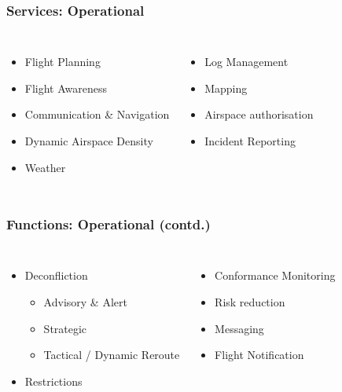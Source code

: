 \documentclass[usenames,dvipsnames,aspectratio=169,serif]{beamer}
\begin{document}

\begin{frame}
   \frametitle{Services: Operational}
   \begin{columns}[t] %

      \begin{itemize}
         \item Flight Planning
         \item Flight Awareness
         \item Communication \& Navigation
         \item Dynamic Airspace Density
         \item Weather
      \end{itemize}

      \begin{itemize}
         \item Log Management
         \item Mapping
         \item Airspace authorisation
         \item Incident Reporting
      \end{itemize}
   \end{columns}
\end{frame}

\begin{frame}
   \frametitle{Functions: Operational (contd.)}
   \begin{columns}[t] %

      \begin{itemize}
         \item Deconfliction
            \begin{itemize}
               \item Advisory \& Alert
               \item Strategic
               \item Tactical / Dynamic Reroute
            \end{itemize}
         \item Restrictions
      \end{itemize}

      \begin{itemize}
         \item Conformance Monitoring
         \item Risk reduction
         \item Messaging
         \item Flight Notification
      \end{itemize}
   \end{columns}

\end{frame}
\end{document}
